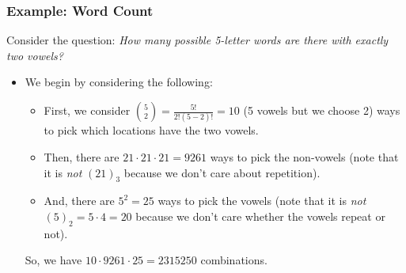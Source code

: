 \documentclass[letterpaper]{article}
\begin{document}
\subsubsection{Example: Word Count}
Consider the question: \emph{How many possible 5-letter words are there with exactly two vowels?}
\begin{itemize}
    \item We begin by considering the following:
    \begin{itemize}
        \item First, we consider $\binom{5}{2} = \frac{5!}{2!(5 - 2)!} = 10$ (5 vowels but we choose 2) ways to pick which locations have the two vowels.
        \item Then, there are $21 \cdot 21 \cdot 21 = 9261$ ways to pick the non-vowels (note that it is \emph{not} $(21)_3$ because we don't care about repetition).
        \item And, there are $5^2 = 25$ ways to pick the vowels (note that it is \emph{not} $(5)_2 = 5 \cdot 4 = 20$ because we don't care whether the vowels repeat or not). 
    \end{itemize}
    So, we have $10 \cdot 9261 \cdot 25 = \boxed{2315250}$ combinations.
\end{itemize}




\newpage 
\end{document}
